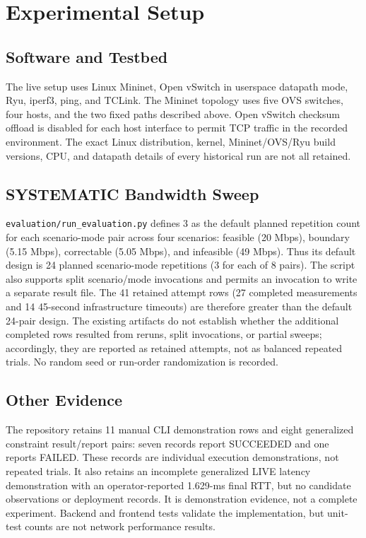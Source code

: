 \documentclass[conference]{IEEEtran}
\begin{document}
\section{Experimental Setup}
\subsection{Software and Testbed}
The live setup uses Linux Mininet, Open vSwitch in userspace datapath mode,
Ryu, iperf3, ping, and TCLink. The Mininet topology uses five OVS switches,
four hosts, and the two fixed paths described above. Open vSwitch checksum
offload is disabled for each host interface to permit TCP traffic in the
recorded environment. The exact Linux distribution, kernel, Mininet/OVS/Ryu
build versions, CPU, and datapath details of every historical run are not
all retained.

\subsection{SYSTEMATIC Bandwidth Sweep}
\texttt{evaluation/run\_evaluation.py} defines 3 as the default planned
repetition count for each scenario-mode pair across four scenarios: feasible
(20 Mbps), boundary (5.15 Mbps), correctable (5.05 Mbps), and infeasible
(49 Mbps). Thus its default design is 24 planned scenario-mode repetitions
(3 for each of 8 pairs). The script also supports split scenario/mode
invocations and permits an invocation to write a separate result file.
The 41 retained attempt rows (27 completed measurements and 14
45-second infrastructure timeouts) are therefore greater than the default
24-pair design. The existing artifacts do not establish whether the additional
completed rows resulted from reruns, split invocations, or partial sweeps;
accordingly, they are reported as retained attempts, not as balanced repeated
trials. No random seed or run-order randomization is recorded.

\subsection{Other Evidence}
The repository retains 11 manual CLI demonstration rows and eight generalized
constraint result/report pairs: seven records report SUCCEEDED and one reports
FAILED. These records are individual execution demonstrations, not repeated
trials. It also retains an incomplete generalized LIVE latency demonstration with an
operator-reported 1.629-ms final RTT, but no candidate observations or
deployment records. It is demonstration evidence, not a complete experiment.
Backend and frontend tests validate the implementation, but unit-test counts
are not network performance results.
\end{document}

